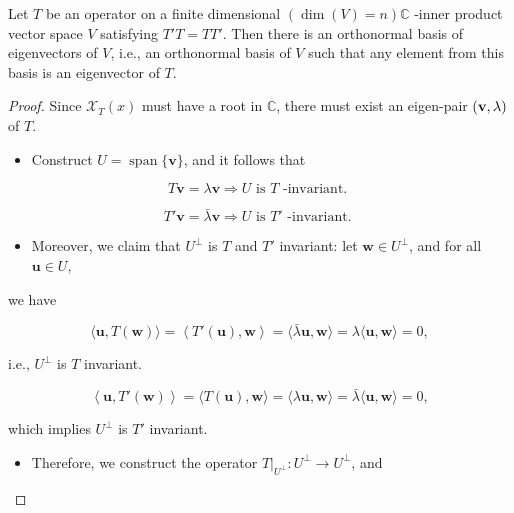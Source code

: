 \begin{theorem}\label{thm:spectral-normal} Let \(T\) be an operator on a finite dimensional \(\left( {\dim \left( V\right)  = n}\right) \mathbb{C}\) -inner product vector space \(V\) satisfying \(T'T = TT'\). Then there is an orthonormal basis of eigenvectors of \(V\), i.e., an orthonormal basis of \(V\) such that any element from this basis is an eigenvector of \(T\).
\end{theorem}
\begin{proof} Since \({\mathcal{X}}_{T}\left( x\right)\) must have a root in \(\mathbb{C}\), there must exist an eigen-pair \(\left( {{\bf v},\lambda }\right)\) of \(T\).

\begin{itemize}
\item Construct \(U = \operatorname{span}\{ \mathbf{v}\}\), and it follows that
\end{itemize}

\[
T\mathbf{v} = \lambda \mathbf{v} \Rightarrow  U\text{ is }T\text{ -invariant. }
\]

\[
T'\mathbf{v} = \bar{\lambda }\mathbf{v} \Rightarrow  U\text{ is }T'\text{ -invariant. }
\]

\begin{itemize}
\item Moreover, we claim that \({U}^{ \bot  }\) is \(T\) and \(T'\) invariant: let \(\mathbf{w} \in  {U}^{ \bot  }\), and for all \(\mathbf{u} \in  U\),
\end{itemize}

we have

\[
\langle \mathbf{u},T\left( \mathbf{w}\right) \rangle  = \left\langle  {T'\left( \mathbf{u}\right),\mathbf{w}}\right\rangle   = \langle \bar{\lambda }\mathbf{u},\mathbf{w}\rangle  = \lambda \langle \mathbf{u},\mathbf{w}\rangle  = 0,
\]

i.e., \({U}^{ \bot  }\) is \(T\) invariant.

\[
\left\langle  {\mathbf{u},T'\left( \mathbf{w}\right) }\right\rangle   = \langle T\left( \mathbf{u}\right),\mathbf{w}\rangle  = \langle \lambda \mathbf{u},\mathbf{w}\rangle  = \bar{\lambda }\langle \mathbf{u},\mathbf{w}\rangle  = 0,
\]

which implies \({U}^{ \bot  }\) is \(T'\) invariant.

\begin{itemize}
\item Therefore, we construct the operator \({\left. T\right| }_{{U}^{ \bot  }} : {U}^{ \bot  } \rightarrow  {U}^{ \bot  }\), and
\end{itemize}


\end{proof}
